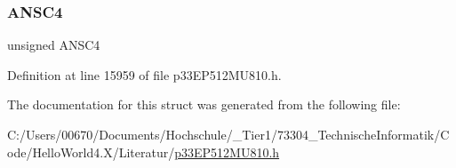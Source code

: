 \subsubsection{\texorpdfstring{A\+N\+S\+C4}{ANSC4}}
{\footnotesize\ttfamily unsigned A\+N\+S\+C4}



Definition at line 15959 of file p33\+E\+P512\+M\+U810.\+h.



The documentation for this struct was generated from the following file\+:\begin{DoxyCompactItemize}
\item 
C\+:/\+Users/00670/\+Documents/\+Hochschule/\+\_\+\+Tier1/73304\+\_\+\+Technische\+Informatik/\+Code/\+Hello\+World4.\+X/\+Literatur/\hyperlink{p33_e_p512_m_u810_8h}{p33\+E\+P512\+M\+U810.\+h}\end{DoxyCompactItemize}
